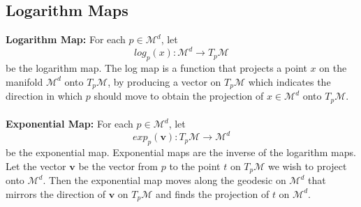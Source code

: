 \documentclass[12pt]{report}
\begin{document}
\newpage

\subsection{Logarithm Maps}
\textbf{Logarithm Map:} For each $p \in \mathcal{M}^d$, let
$$log_p(x):\mathcal{M}^d\longrightarrow T_p\mathcal{M}$$
be the logarithm map. The log map is a function that projects a point $x$ 
on the manifold $\mathcal{M}^d$ onto $T_p\mathcal{M}$,
by producing a vector on $T_p\mathcal{M}$ which indicates the direction in which $p$
should move to obtain the projection of $x \in \mathcal{M}^d$ onto $T_p\mathcal{M}$.\\
\\
\textbf{Exponential Map:} For each $p \in \mathcal{M}^d$, let
$$exp_p(\mathbf{v}): T_p\mathcal{M} \longrightarrow \mathcal{M}^d$$
be the exponential map. Exponential maps are the inverse of the logarithm maps.
Let the vector $\mathbf{v}$ be the vector from $p$ to the point $t$ on $T_p\mathcal{M}$ we
wish to project onto $\mathcal{M}^d$. Then the exponential map moves along
the geodesic on $\mathcal{M}^d$ that mirrors the direction of $\mathbf{v}$
on $T_p\mathcal{M}$ and finds the projection of $t$ on $\mathcal{M}^d$.
\end{document}
